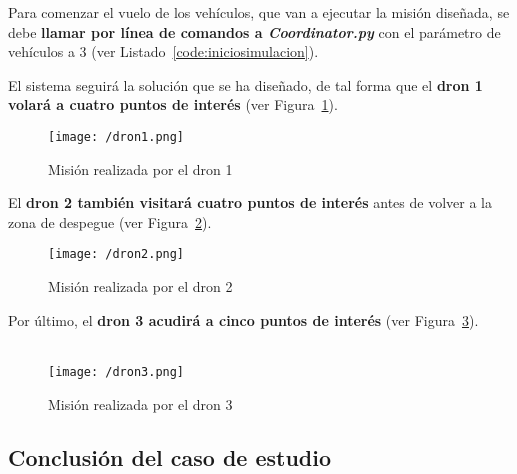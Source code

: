 Para comenzar el vuelo de los vehículos, que van a ejecutar la misión diseñada, se debe \textbf{llamar por línea de comandos a \textit{Coordinator.py}} con el parámetro de vehículos a 3 (ver Listado~\ref{code:iniciosimulacion}).


El sistema seguirá la solución que se ha diseñado, de tal forma que el \textbf{dron 1 volará a cuatro puntos de interés} (ver Figura~\ref{fig:dron1}).

\begin{figure}[!h]
\begin{center}
\texttt{[image: /dron1.png]}
\caption[Misión realizada por el dron 1]{Misión realizada por el dron 1}
\label{fig:dron1}
\end{center}
\end{figure}

El \textbf{dron 2 también visitará cuatro puntos de interés} antes de volver a la zona de despegue (ver Figura~\ref{fig:dron2}).

\begin{figure}[!h]
\begin{center}
\texttt{[image: /dron2.png]}
\caption[Misión realizada por el dron 2]{Misión realizada por el dron 2}
\label{fig:dron2}
\end{center}
\end{figure}

Por último, el \textbf{dron 3 acudirá a cinco puntos de interés} (ver Figura~\ref{fig:dron3}). \\ \\

\begin{figure}[!h]
\begin{center}
\texttt{[image: /dron3.png]}
\caption[Misión realizada por el dron 3]{Misión realizada por el dron 3}
\label{fig:dron3}
\end{center}
\end{figure}


\subsection{Conclusión del caso de estudio}

